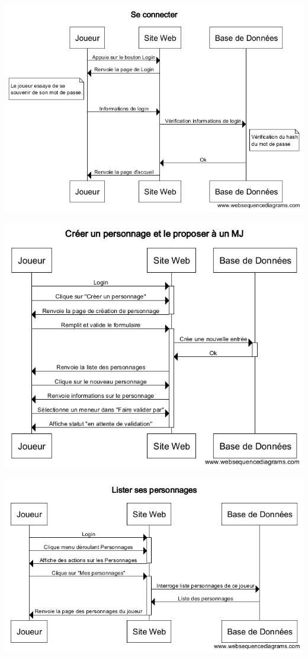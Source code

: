 \documentclass[a4paper, 11pt, titlepage]{article}
\begin{document}
\begin{center}
\includegraphics[scale=0.55]{sequence/Connexion.png}
\end{center}

\begin{center}
\includegraphics[scale=0.55]{sequence/CreerPersonnageEtProposerMJ.png}
\end{center}

\begin{center}
\includegraphics[scale=0.55]{sequence/ListerPersonnages.png}
\end{center}
\end{document}
